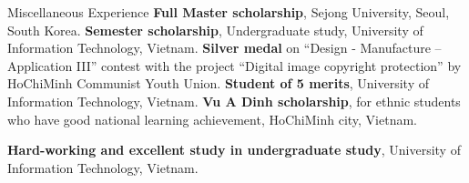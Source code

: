 \begin{rubric}{Miscellaneous Experience}
\entry*[2016-2018] \textbf{Full Master scholarship}, Sejong University, Seoul, South Korea.
\entry*[2011-2015] \textbf{Semester scholarship}, Undergraduate study, University of Information Technology, Vietnam.
\entry*[2015] \textbf{Silver medal} on “Design - Manufacture – Application III” contest with the project “Digital image copyright protection” by HoChiMinh Communist Youth Union.
\entry*[2013-2014] \textbf{Student of 5 merits}, University of Information Technology, Vietnam.
%
\entry*[2013] \textbf{Vu A Dinh scholarship}, for ethnic students who have good national learning achievement, HoChiMinh city, Vietnam.

\entry*[2016] \textbf{Hard-working and excellent study in undergraduate study}, University of Information Technology, Vietnam.


\end{rubric}